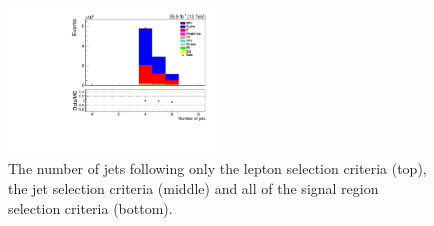 \begin{figure}[ht]
\includegraphics[width=0.49\textwidth]{figs/background-estimation/plots/unblinded/prompt_mumu_ttbarInc/numbJets_NPL_mumu_wMass_mumu.pdf}
\caption{
The number of jets following only the lepton selection criteria (top), the jet selection criteria (middle) and all of the signal region selection criteria (bottom).
}
\label{fig:SR_nJets}
\end{figure}

